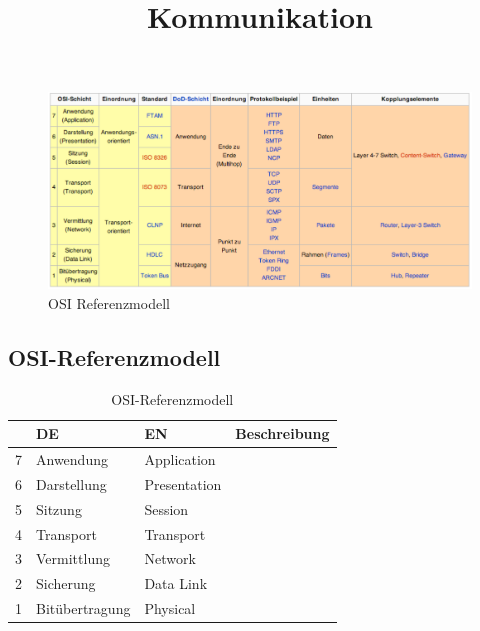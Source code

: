 \documentclass[]{scrartcl}
\begin{document}
\title{Kommunikation}
\author{}

\maketitle
\tableofcontents

\begin{figure}[htb]
\begin{center}
\includegraphics[scale=0.6]{figures/osi.pdf}
\caption{OSI Referenzmodell}
\label{osi}
\end{center}
\end{figure}

\subsection{OSI-Referenzmodell}

\begin{table}[H]
\begin{center}
\begin{tabular}{llll}
 & DE & EN & Beschreibung \\
\toprule
7 & Anwendung & Application & \\
\midrule
6 & Darstellung & Presentation & \\
\midrule
5 & Sitzung & Session & \\
\midrule
4 & Transport & Transport & \\
\midrule
3 & Vermittlung & Network & \\
\midrule
2 & Sicherung & Data Link & \\
\midrule
1& Bit\"ubertragung & Physical &  \\
\bottomrule
\end{tabular}
\caption{OSI-Referenzmodell}

\end{center}
\label{default}
\end{table}%
\end{document}
